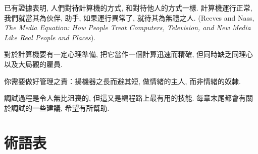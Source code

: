 \documentclass[10pt]{book}
\begin{document}
已有證據表明, 人們對待計算機的方式, 和對待他人的方式一樣. 
計算機運行正常, 我們就當其為伙伴, 助手, 如果運行異常了, 就待其為無禮之人. 
 (Reeves and Nass, {\it The Media
 Equation: How People Treat Computers, Television, and New Media
 Like Real People and Places}).

對於計算機要有一定心理準備, 把它當作一個計算迅速而精確, 
但同時缺乏同理心以及大局觀的雇員. 

你需要做好管理之責：揚機器之長而避其短, 做情緒的主人, 而非情緒的奴隸. 

調試過程是令人無比沮喪的, 但這又是編程路上最有用的技能. 
每章末尾都會有關於調試的一些建議, 希望有所幫助. 


\section{術語表}
\end{document}

